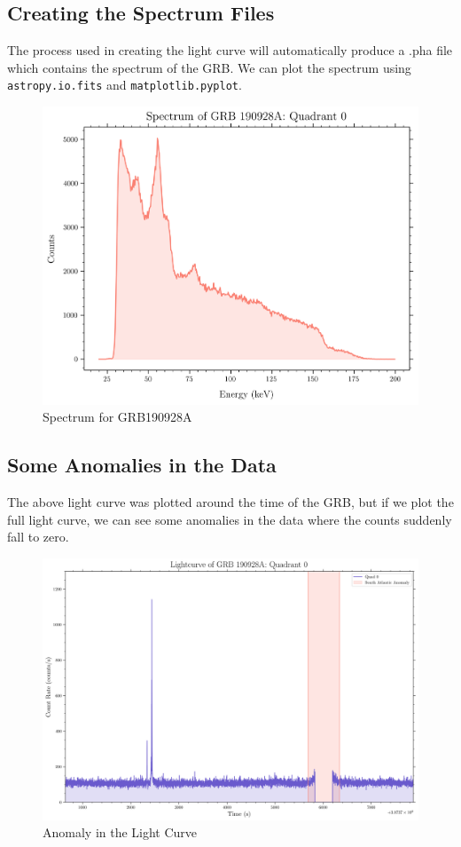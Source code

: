 \documentclass[11pt]{book} %
\begin{document}
\subsection{Creating the Spectrum Files}

The process used in creating the light curve will automatically produce a .pha file which contains the spectrum of the GRB. We can plot the spectrum using \lstinline[language=Python]{astropy.io.fits} and \lstinline[language=Python]{matplotlib.pyplot}.

\begin{figure}[H]
    \centering
    \includegraphics[scale=0.55]{Pictures/spectrum.png}
    \caption{Spectrum for GRB190928A}
\end{figure}

\subsection{Some Anomalies in the Data}

The above light curve was plotted around the time of the GRB, but if we plot the full light curve, we can see some anomalies in the data where the counts suddenly fall to zero.
\begin{figure}[H]
    \centering
    \includegraphics[scale=0.3]{Pictures/anomaly.png}
    \caption{Anomaly in the Light Curve}\label{fig:anomaly}
\end{figure}
\end{document}
